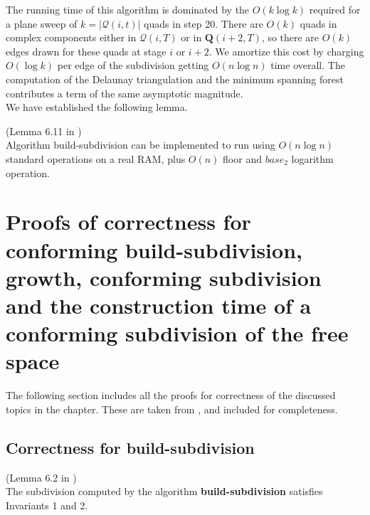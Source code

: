 The running time of this algorithm is dominated by the $O(k \log k)$ required for a plane sweep \cite{CompGeo} of $k=|\mathcal{Q}(i,t)|$ quads in step 20. There are $O(k)$ quads in complex components either in $\mathcal{Q}(i,T)$ or in $\mathbf{Q}(i+2,T)$, so there are $O(k)$ edges drawn for these quads at stage $i$ or $i+2$. We amortize this cost by charging $O(\log k)$ per edge of the subdivision getting $O(n\log n)$ time overall. The computation of the Delaunay triangulation and the minimum spanning forest contributes a term of the same asymptotic magnitude.\\
We have established the following lemma.

\begin{Lemma} (Lemma 6.11 in \cite{HershbergerS99}) \label{lemma:6.11HershbergerS99}\\
Algorithm build-subdivision can be implemented to run using $O(n \log n)$ standard operations on a real RAM, plus $O(n)$ floor and $base_2$ logarithm operation.
\end{Lemma}

\section{Proofs of correctness for conforming build-subdivision, growth, conforming subdivision and the construction time of a conforming subdivision of the free space}

The following section includes all the proofs for correctness of the discussed topics in the chapter. These are taken from \cite{HershbergerS99}, and included for completeness.

\subsection{Correctness for \textbf{build-subdivision}}

\begin{Lemma} (Lemma 6.2 in \cite{HershbergerS99}) \\
The subdivision computed by the algorithm \textbf{build-subdivision} satisfies Invariants 1 and 2.
\end{Lemma}

